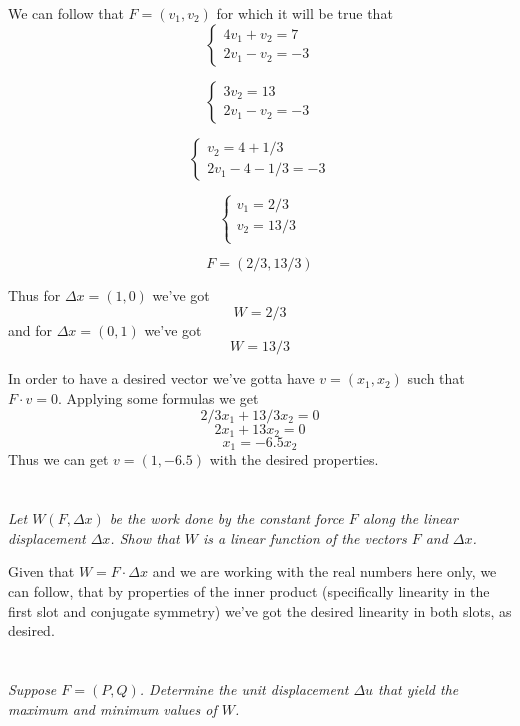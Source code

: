 \documentclass[11pt,oneside,titlepage]{book}
\begin{document}
We can follow that $F = (v_1, v_2)$ for which it will be true that
$$
\begin{cases}
  4 v_1 + v_2 = 7 \\
  2 v_1 - v_2 = -3
\end{cases}
$$

$$
\begin{cases}
  3v_2  = 13 \\
  2 v_1 - v_2 = -3
\end{cases}
$$

$$
\begin{cases}
  v_2  = 4 + 1/3 \\
  2 v_1 - 4 - 1/3 = -3
\end{cases}
$$

$$
\begin{cases}
  v_1 = 2/3 \\ 
  v_2  = 13/3 \\
\end{cases}
$$

$$F = (2/3, 13/3)$$

Thus for $\Delta x = (1, 0)$ we've got
$$W  = 2/3$$
and for $\Delta x = (0, 1)$ we've got
$$W  = 13/3$$

In order to have a desired vector we've gotta have $v = (x_1, x_2)$ such that $F \cdot v = 0$.
Applying some formulas we get 
$$2/3 x_1 + 13/3 x_2 = 0$$
$$2 x_1 + 13 x_2 = 0$$
$$x_1 = -6.5 x_2$$
Thus we can get $v = (1, -6.5)$ with the desired properties.

\section{}

\textit{Let $W(F, \Delta x)$ be the work done by the constant force $F$ along the linear
  displacement $\Delta x$. Show that $W$ is a linear function of the vectors $F$ and
  $\Delta x $.}

Given that $W = F \cdot \Delta x$ and we are working with the real numbers here only,
we can follow, that by properties of the inner product (specifically linearity in the first slot
and conjugate symmetry) we've got the desired linearity in both slots, as desired.

\section{}

\textit{Suppose $F = (P, Q)$. Determine the unit displacement $\Delta u$
  that yield the maximum and minimum values of $W$.}
\end{document}
